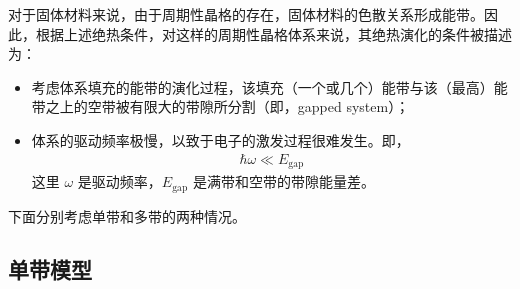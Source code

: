 对于固体材料来说，由于周期性晶格的存在，固体材料的色散关系形成能带。因此，根据上述绝热条件，对这样的周期性晶格体系来说，其绝热演化的条件被描述为：
\begin{itemize}
\item 考虑体系填充的能带的演化过程，该填充（一个或几个）能带与该（最高）能带之上的空带被有限大的带隙所分割（即，gapped system）；
\item 体系的驱动频率极慢，以致于电子的激发过程很难发生。即，
\begin{align}
\hbar\omega \ll E_{\text{gap}}
\end{align}
这里 $\omega$ 是驱动频率，$E_{\text{gap}}$ 是满带和空带的带隙能量差。
\end{itemize}

下面分别考虑单带和多带的两种情况。



\subsection{单带模型}\label{sec:adiab:single}

